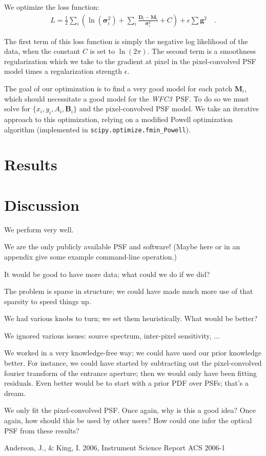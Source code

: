 \documentclass[12pt,letterpaper,preprint]{aastex}
\newcommand{\instrument}[1]{\textsl{#1}}
\newcommand{\vect}[1]{\mathbf{#1}}
\newcommand{\WFC}{\instrument{WFC3}}
\newcommand{\data}{\vect{D}}
\newcommand{\model}{\vect{M}}
\newcommand{\bkg}{\vect{B}}
\newcommand{\var}{\vect{\sigma}^2}
\newcommand{\gradients}{\vect{g}}
\begin{document}
We optimize the loss function:
\begin{eqnarray}
L =  \frac{1}{2}\sum_i\left(\ln(\var_i) + \sum_{i} \frac{\data_i - \model_i}{\var_i} + C\right) + 
\epsilon \sum \gradients^2 
\quad .
\label{eqn:model-noflat}
\end{eqnarray}

\noindent The first term of this loss function is simply the negative log likelihood of the data, 
when the constant $C$ is set to $\ln(2\pi)$.  The second term is a smoothness regularization which 
we take to the gradient at pixel in the pixel-convolved PSF model times a regularization 
strength $\epsilon$.

The goal of our optimization is to find a very good model for each patch $\model_i$, which should 
necessitate a good model for the \WFC\ PSF.  To do so we must solve for $\{ x_i, y_i, A_i, \bkg_i \}$ 
and the pixel-convolved PSF model.  We take an iterative approach to this optimization, relying on  
a modified Powell optimization algorithm (implemented in \texttt{scipy.optimize.fmin\_Powell}). 

\section{Results}

\section{Discussion}

We perform very well.

We are the only publicly available PSF and software!
(Maybe here or in an appendix give some example command-line operation.)

It would be good to have more data;
  what could we do if we did?

The problem is sparse in structure;
  we could have made much more use of that sparsity to speed things up.

We had various knobs to turn; we set them heuristically.
What would be better?

We ignored various issues: source spectrum, inter-pixel sensitivity, ...

We worked in a very knowledge-free way;
  we could have used our prior knowledge better.
For instance, we could have started by subtracting out the pixel-convolved fourier transform of the entrance aperture;
  then we would only have been fitting residuals.
Even better would be to start with a prior PDF over PSFs;
  that's a dream.

We only fit the pixel-convolved PSF.
Once again, why is this a good idea?
Once again, how should this be used by other users?
How could one infer the optical PSF from these results?

\clearpage


\begin{thebibliography}{44}

{Anderson}, J., \& {King}, I. 2006, Instrument Science Report ACS 2006-1

\end{thebibliography}
\end{document}
